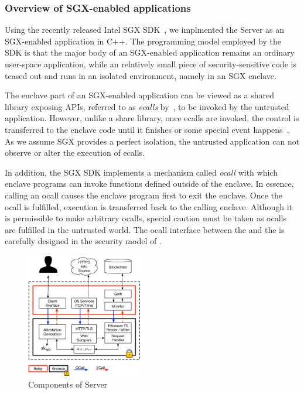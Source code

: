 
\subsubsection{Overview of SGX-enabled applications}

Using the recently released Intel SGX SDK~\cite{sgxsdk}, we implmented the \tc
Server as an SGX-enabled application in C++. The programming model employed by
the SDK is that the major body of an SGX-enabled application remains an
ordinary user-space application, while an relatively small piece of security-sensitive code
is teased out and runs in an isolated environment, namely in an SGX enclave.

The enclave part of an SGX-enabled application can be
viewed as a shared library exposing APIs, referred to as \emph{ecalls} by~\cite{sgxsdk},
to be invoked by the untrusted application. However, unlike a share library,  
once ecalls are invoked, the control is transferred to the 
enclave code until it finishes or some special event happens~\cite{sgxmanual}.
As we assume SGX provides a perfect isolation, the untrusted application can not
observe or alter the execution of ecalls.

In addition, the SGX SDK implements a mechanism called \emph{ocall} with which enclave
programs can invoke functions defined outside of the enclave. In essence,
calling an ocall causes the enclave program first to exit the enclave. Once the
ocall is fulfilled, execution is transferred back to the calling enclave. 
Although it is permissible to make arbitrary ocalls, special caution must be 
taken as ocalls are fulfilled in the untrusted world.
The ocall interface between the \encname and the \medname is carefully designed
in the security model of \tc.

\begin{figure}[h]
    \centering
    \includegraphics[width=0.45\textwidth]{figures/impl}
    \caption{Components of \tc Server}
    \label{fig:tcserver_impl}
\end{figure}

